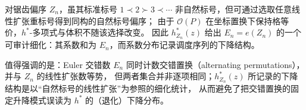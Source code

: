 \begin{remark}\label{rem:pom-fence-hstar-refinement}
对锯齿偏序 \(Z_n\)，虽其标准标号 \(1\prec 2\succ 3\prec\cdots\) 非自然标号，但可通过选取任意线性扩张重标号得到同构的自然标号偏序；
由于 \(\mathcal O(P)\) 在坐标置换下保持格等价，\(h^*\)-多项式与体积不随该选择改变。
因此 \(h_{Z_n}^*(z)\) 给出 \(E_n=e(Z_n)\) 的一个可审计细化：其系数和为 \(E_n\)，而系数分布记录调度序列的下降结构。
\par
值得强调的是：Euler 交错数 \(E_n\) 同时计数交错置换（alternating permutations），并与 \(Z_n\) 的线性扩张数等势，
但两者集合并非逐项相同；\(h_{Z_n}^*(z)\) 所记录的下降结构是以“自然标号的线性扩张”为参照的细化统计，
从而避免了把交错置换的固定升降模式误读为 \(h^*\) 的（退化）下降分布。
\end{remark}

